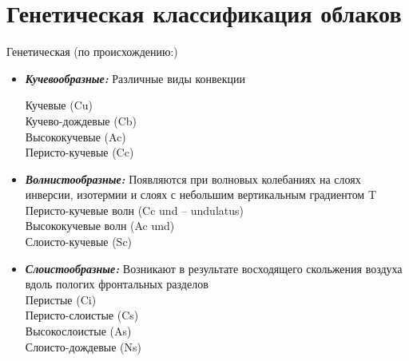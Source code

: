 
\section{Генетическая классификация облаков}
Генетическая (по происхождению:)
\begin{itemize}
	\item \textbf{\textit{Кучевообразные:}} Различные виды конвекции\\
	{
		\setlength{\columnseprule}{0pt}
		\begin{multicols*}{2} 	Кучевые (Cu)\\
			Кучево-дождевые (Cb)\\
			Высококучевые (Ac)\\
			Перисто-кучевые (Cc)
		\end{multicols*}
	}

	\item \textbf{\textit{Волнистообразные:}} Появляются при волновых колебаниях на слоях инверсии, изотермии и слоях с небольшим вертикальным градиентом T\\
	Перисто-кучевые волн (Cc und – undulatus)\\
	Высококучевые волн (Ac und)\\
	Слоисто-кучевые (Sc)\\
	\item \textbf{\textit{Слоистообразные:}} Возникают в результате восходящего скольжения воздуха вдоль пологих фронтальных разделов  \\
	Перистые (Ci)\\
	Перисто-слоистые (Cs)\\
	Высокослоистые (As)\\
	Слоисто-дождевые (Ns)
\end{itemize}
